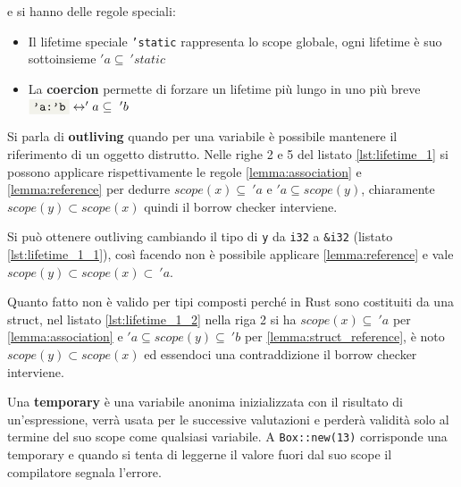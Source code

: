 \documentclass[Lau,binding=0.6cm]{sapthesis}
\newcommand{\textcode}[1]{\colorbox{backcolour}{\texttt{#1}}}
\begin{document}

e si hanno delle regole speciali:
\begin{itemize}
    \item Il lifetime speciale \textcode{'static} rappresenta lo scope globale, ogni lifetime è suo sottoinsieme $ 'a \subseteq \ 'static $
    \item La \textbf{coercion} permette di forzare un lifetime più lungo in uno più breve $ \textnormal{\textcode{'a:'b}} \leftrightarrow 'a \subseteq \ 'b $
\end{itemize}

Si parla di \textbf{outliving} quando per una variabile è possibile mantenere il riferimento di un oggetto distrutto. 
Nelle righe 2 e 5 del listato \ref{lst:lifetime_1} si possono applicare rispettivamente le regole \ref{lemma:association} e \ref{lemma:reference} per dedurre $ scope(x) \subseteq \ 'a $ e $ 'a \subseteq scope(y) $, chiaramente $ scope(y) \subset scope(x) $ quindi il borrow checker interviene.




Si può ottenere outliving cambiando il tipo di \textcode{y} da \textcode{i32} a \textcode{\&i32} (listato \ref{lst:lifetime_1_1}), così facendo non è possibile applicare \ref{lemma:reference} e vale $ scope(y) \subset scope(x) \subset \ 'a $.




Quanto fatto non è valido per tipi composti perché in Rust sono costituiti da una struct, nel listato \ref{lst:lifetime_1_2} nella riga 2 si ha $ scope(x) \subseteq \ 'a $ per \ref{lemma:association} e $ 'a \subseteq scope(y) \subseteq \ 'b$ per \ref{lemma:struct_reference}, è noto $ scope(y) \subset scope(x) $ ed essendoci una contraddizione il borrow checker interviene.  




Una \textbf{temporary} è una variabile anonima inizializzata con il risultato di un'espressione, verrà usata per le successive valutazioni e perderà validità solo al termine del suo scope come qualsiasi variabile. 
A \textcode{Box::new(13)} corrisponde una temporary e quando si tenta di leggerne il valore fuori dal suo scope il compilatore segnala l'errore. 
\end{document}
